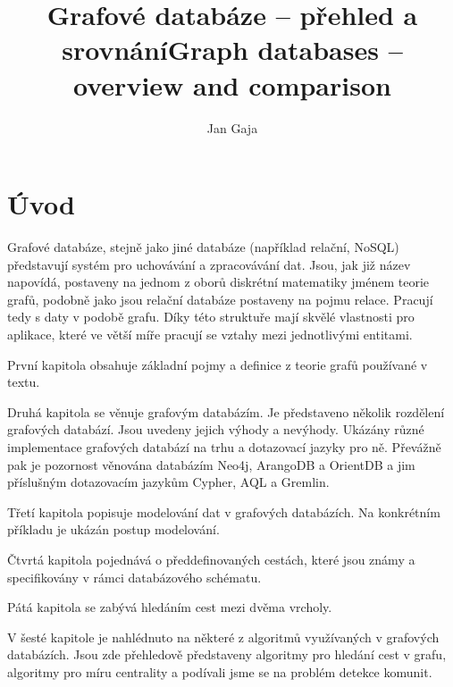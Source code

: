 \documentclass[
  program=infoi,
  biblatex=true,
  sourcecodes=true,
  figures=true,
  glossaries=false,
  index
]{kidiplom}
\title{Grafové databáze – přehled a srovnání}
\title[english]{Graph databases – overview and comparison}
\author{Jan Gaja}
\begin{document}
\maketitle



\newcommand{\BibLaTeX}{\textsc{Bib}\LaTeX}

\section*{Úvod}

Grafové databáze, stejně jako jiné databáze (například relační, NoSQL) představují systém pro uchovávání a zpracovávání dat. Jsou, jak již název napovídá, postaveny na jednom z oborů diskrétní matematiky jménem teorie grafů, podobně jako jsou relační databáze postaveny na pojmu relace. Pracují tedy s daty v podobě grafu. Díky této struktuře mají skvělé vlastnosti pro aplikace, které ve větší míře pracují se vztahy mezi jednotlivými entitami.

První kapitola obsahuje základní pojmy a definice z teorie grafů používané v textu.

Druhá kapitola se věnuje grafovým databázím. Je představeno několik rozdělení grafových databází. Jsou uvedeny jejich výhody a nevýhody. Ukázány různé implementace grafových databází na trhu a dotazovací jazyky pro ně. Převážně pak je pozornost věnována databázím Neo4j, ArangoDB a OrientDB a jim příslušným dotazovacím jazykům Cypher, AQL a Gremlin.

Třetí kapitola popisuje modelování dat v grafových databázích. Na konkrétním příkladu je ukázán postup modelování.

Čtvrtá kapitola pojednává o předdefinovaných cestách, které jsou známy a specifikovány v rámci databázového schématu. 

Pátá kapitola se zabývá hledáním cest mezi dvěma vrcholy.

V šesté kapitole je nahlédnuto na některé z algoritmů využívaných v grafových databázích. Jsou zde přehledově představeny algoritmy pro hledání cest v grafu, algoritmy pro míru centrality a podívali jsme se na problém detekce komunit.
\end{document}
